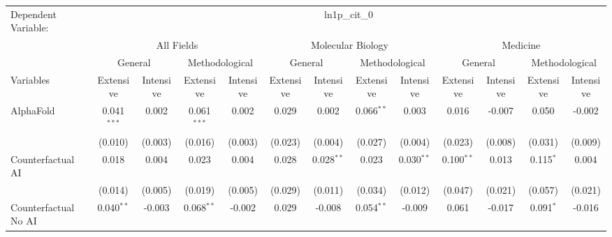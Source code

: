 \begingroup
\centering
\begin{tabular}{lcccccccccccc}
   \tabularnewline \midrule \midrule
   Dependent Variable: & \multicolumn{12}{c}{ln1p\_cit\_0}\\
 & \multicolumn{4}{c}{All Fields} & \multicolumn{4}{c}{Molecular Biology} & \multicolumn{4}{c}{Medicine} \\
\cmidrule(lr){2-5} \cmidrule(lr){6-9} \cmidrule(lr){10-13}
 & \multicolumn{2}{c}{General} & \multicolumn{2}{c}{Methodological} & \multicolumn{2}{c}{General} & \multicolumn{2}{c}{Methodological} & \multicolumn{2}{c}{General} & \multicolumn{2}{c}{Methodological} \\
\cmidrule(lr){2-3} \cmidrule(lr){4-5} \cmidrule(lr){6-7} \cmidrule(lr){8-9} \cmidrule(lr){10-11} \cmidrule(lr){12-13}
Variables & \multicolumn{1}{c}{Extensive} & \multicolumn{1}{c}{Intensive} & \multicolumn{1}{c}{Extensive} & \multicolumn{1}{c}{Intensive} & \multicolumn{1}{c}{Extensive} & \multicolumn{1}{c}{Intensive} & \multicolumn{1}{c}{Extensive} & \multicolumn{1}{c}{Intensive} & \multicolumn{1}{c}{Extensive} & \multicolumn{1}{c}{Intensive} & \multicolumn{1}{c}{Extensive} & \multicolumn{1}{c}{Intensive} \\
\cmidrule(lr){1-1}\cmidrule(lr){2-2} \cmidrule(lr){3-3} \cmidrule(lr){4-4} \cmidrule(lr){5-5} \cmidrule(lr){6-6} \cmidrule(lr){7-7} \cmidrule(lr){8-8} \cmidrule(lr){9-9} \cmidrule(lr){10-10} \cmidrule(lr){11-11} \cmidrule(lr){12-12} \cmidrule(lr){13-13}
   AlphaFold                                & 0.041$^{***}$ & 0.002         & 0.061$^{***}$ & 0.002    & 0.029        & 0.002          & 0.066$^{**}$   & 0.003           & 0.016         & -0.007  & 0.050         & -0.002\\   
                                            & (0.010)       & (0.003)       & (0.016)       & (0.003)  & (0.023)      & (0.004)        & (0.027)        & (0.004)         & (0.023)       & (0.008) & (0.031)       & (0.009)\\   
   Counterfactual AI                        & 0.018         & 0.004         & 0.023         & 0.004    & 0.028        & 0.028$^{**}$   & 0.023          & 0.030$^{**}$    & 0.100$^{**}$  & 0.013   & 0.115$^{*}$   & 0.004\\   
                                            & (0.014)       & (0.005)       & (0.019)       & (0.005)  & (0.029)      & (0.011)        & (0.034)        & (0.012)         & (0.047)       & (0.021) & (0.057)       & (0.021)\\   
   Counterfactual No AI                     & 0.040$^{**}$  & -0.003        & 0.068$^{**}$  & -0.002   & 0.029        & -0.008         & 0.054$^{**}$   & -0.009          & 0.061         & -0.017  & 0.091$^{*}$   & -0.016\\   

\end{tabular}
